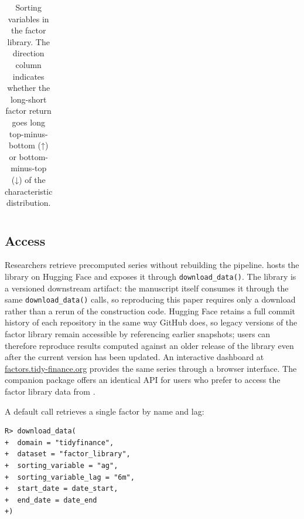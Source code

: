 \documentclass[
  article]{jss}
\begin{document}
\begin{longtable}{lp{5.5cm}lp{6.5cm}}
\caption{\label{tbl-sorting-variables}Sorting variables in the factor
library. The direction column indicates whether the long-short factor
return goes long top-minus-bottom (↑) or bottom-minus-top (↓) of the
characteristic distribution.}

\tabularnewline
\end{longtable}

\endgroup

\endgroup

\subsection{Access}\label{sec-library-access}

Researchers retrieve precomputed series without rebuilding the pipeline.
 hosts the library on Hugging Face and exposes it
through \texttt{download\_data()}. The library is a versioned downstream
artifact: the manuscript itself consumes it through the same
\texttt{download\_data()} calls, so reproducing this paper requires only
a download rather than a rerun of the construction code. Hugging Face
retains a full commit history of each repository in the same way GitHub
does, so legacy versions of the factor library remain accessible by
referencing earlier snapshots; users can therefore reproduce results
computed against an older release of the library even after the current
version has been updated. An interactive dashboard at
\href{https://factors.tidy-finance.org}{factors.tidy-finance.org}
provides the same series through a browser interface. The companion
 package  offers an identical API for
users who prefer to access the factor library data from
.

A default call retrieves a single factor by name and lag:

\begin{verbatim}
R> download_data(
+  domain = "tidyfinance",
+  dataset = "factor_library",
+  sorting_variable = "ag",
+  sorting_variable_lag = "6m",
+  start_date = date_start,
+  end_date = date_end
+)
\end{verbatim}
\end{document}
